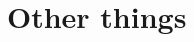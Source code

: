 \documentclass[12pt]{article}
\begin{document}
%
%
%
%
%

\section{Other things}



\bigskip
\end{document}
